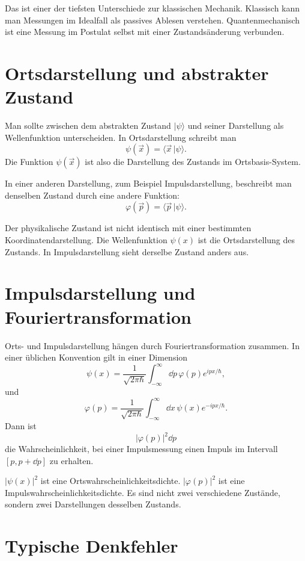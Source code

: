 Das ist einer der tiefsten Unterschiede zur klassischen Mechanik. Klassisch kann man Messungen im Idealfall als passives Ablesen verstehen. Quantenmechanisch ist eine Messung im Postulat selbst mit einer Zustandsänderung verbunden.

\section{Ortsdarstellung und abstrakter Zustand}

Man sollte zwischen dem abstrakten Zustand $\lvert\psi\rangle$ und seiner Darstellung als Wellenfunktion unterscheiden. In Ortsdarstellung schreibt man
\[
    \psi(\vec{x})=\langle \vec{x}\,|\psi\rangle.
\]
Die Funktion $\psi(\vec{x})$ ist also die Darstellung des Zustands im Ortsbasis-System.

In einer anderen Darstellung, zum Beispiel Impulsdarstellung, beschreibt man denselben Zustand durch eine andere Funktion:
\[
    \varphi(\vec{p})=\langle \vec{p}\,|\psi\rangle.
\]

\begin{conceptbox}
Der physikalische Zustand ist nicht identisch mit einer bestimmten Koordinatendarstellung. Die Wellenfunktion $\psi(x)$ ist die Ortsdarstellung des Zustands. In Impulsdarstellung sieht derselbe Zustand anders aus.
\end{conceptbox}

\section{Impulsdarstellung und Fouriertransformation}

Orts- und Impulsdarstellung hängen durch Fouriertransformation zusammen. In einer üblichen Konvention gilt in einer Dimension
\[
    \psi(x)=\frac{1}{\sqrt{2\pi\hbar}}\int_{-\infty}^{\infty}\dd p\,\varphi(p)e^{ipx/\hbar},
\]
und
\[
    \varphi(p)=\frac{1}{\sqrt{2\pi\hbar}}\int_{-\infty}^{\infty}\dd x\,\psi(x)e^{-ipx/\hbar}.
\]
Dann ist
\[
    |\varphi(p)|^2\dd p
\]
die Wahrscheinlichkeit, bei einer Impulsmessung einen Impuls im Intervall $[p,p+\dd p]$ zu erhalten.

\begin{notebox}
$|\psi(x)|^2$ ist eine Ortswahrscheinlichkeitsdichte. $|\varphi(p)|^2$ ist eine Impulswahrscheinlichkeitsdichte. Es sind nicht zwei verschiedene Zustände, sondern zwei Darstellungen desselben Zustands.
\end{notebox}

\section{Typische Denkfehler}

